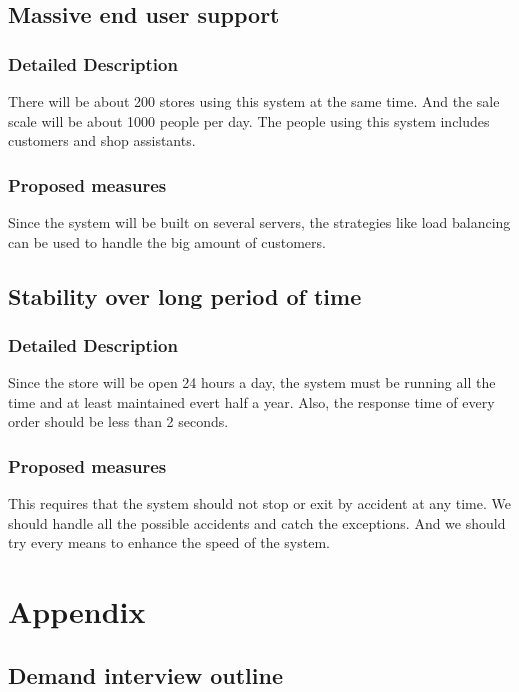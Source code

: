 \documentclass[a4paper]{report}
\begin{document}
\section{Massive end user support}
\subsection{Detailed Description}
There will be about 200 stores using this system at the same time. And the sale scale will be about 1000 people per day. The people using this system includes customers and shop assistants.
\subsection{Proposed measures}
Since the system will be built on several servers, the strategies like load balancing can be used to handle the big amount of customers.

\section{Stability over long period of time}
\subsection{Detailed Description}
Since the store will be open 24 hours a day, the system must be running all the time and at least maintained evert half a year. Also, the response time of every order  should be less than 2 seconds.
\subsection{Proposed measures}
This requires that the system should not stop or exit by accident at any time. We should handle all the possible accidents and catch the exceptions. And we should try every means to enhance the speed of the system.

\chapter{Appendix}
\section{Demand interview outline}
\end{document}
